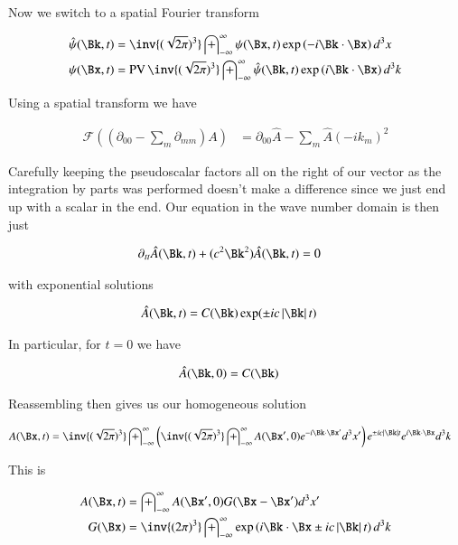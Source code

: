 \documentclass{article}
\DeclareMathOperator{\PV}{PV}
\newcommand{\FF}[0]{\mathcal{F}}
\newcommand{\IIinf}[0]{ \int_{-\infty}^\infty }
\begin{document}
Now we switch to a spatial Fourier transform

\begin{align}\label{eqn:3DFourierTxDefinition}
\hat{\psi}(\Bk, t) &= \inv{(\sqrt{2\pi})^3} \IIinf \psi(\Bx, t) \exp\left( -i \Bk \cdot \Bx \right) d^3 x \\
{\psi}(\Bx, t) &= \PV \inv{(\sqrt{2\pi})^3} \IIinf \hat{\psi}(\Bk, t) \exp\left( i \Bk \cdot \Bx \right) d^3 k
\end{align}

Using a spatial transform we have

\begin{align*}
\FF((\partial_{00} - \sum_m \partial_{mm}) A)
&= \partial_{00} \hat{A} - \sum_m \hat{A} (-i k_m)^2 
\end{align*}

Carefully keeping the pseudoscalar factors all on the right of our vector as the integration by parts was performed doesn't make a difference since we just end up with a scalar in the end.  Our equation in the wave number domain is then just

\begin{align*}
\partial_{tt} \hat{A}(\Bk,t) + (c^2 \Bk^2) \hat{A}(\Bk,t) &= 0 %
\end{align*}

with exponential solutions

\begin{align*}
\hat{A}(\Bk, t) &= C(\Bk) \exp(\pm i c \Abs{\Bk} t)
\end{align*}

In particular, for $t = 0$ we have

\begin{align*}
\hat{A}(\Bk, 0) &= C(\Bk)
\end{align*}

Reassembling then gives us our homogeneous solution

\begin{align*}
{A}(\Bx, t)
&= 
\inv{(\sqrt{2\pi})^3} \IIinf 
\left( \inv{(\sqrt{2\pi})^3} \IIinf A(\Bx', 0) e^{ -i \Bk \cdot \Bx' } d^3 x' \right) e^{\pm i c \Abs{\Bk} t}
e^{ i \Bk \cdot \Bx } d^3 k
\end{align*}

This is

\begin{align}\label{eqn:potentialHomogeneous}
{A}(\Bx, t) &= \IIinf A(\Bx', 0) G( \Bx - \Bx' ) d^3 x' \\
G(\Bx) &= \inv{({2\pi})^3} \IIinf \exp\left( i \Bk \cdot \Bx \pm i c \Abs{\Bk} t \right) d^3 k
\end{align}
\end{document}
